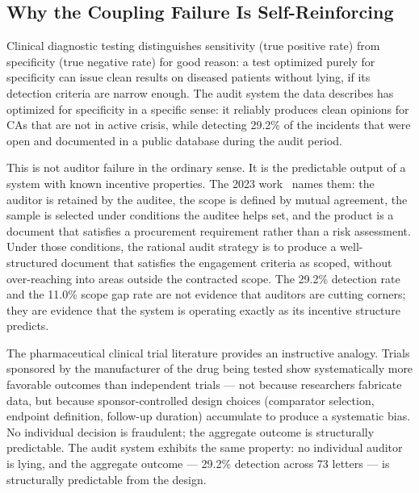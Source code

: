 \documentclass[10pt,twocolumn,letterpaper]{article}
\begin{document}
\subsection{Why the Coupling Failure Is Self-Reinforcing}

Clinical diagnostic testing distinguishes sensitivity (true positive
rate) from specificity (true negative rate) for good reason: a test
optimized purely for specificity can issue clean results on diseased
patients without lying, if its detection criteria are narrow enough.
The audit system the data describes has optimized for specificity in
a specific sense: it reliably produces clean opinions for CAs that
are not in active crisis, while detecting 29.2\% of the incidents that
were open and documented in a public database during the audit period.

This is not auditor failure in the ordinary sense. It is the predictable
output of a system with known incentive properties. The 2023
work~\cite{hurst2023} names them: the auditor is retained by the auditee,
the scope is defined by mutual agreement, the sample is selected under
conditions the auditee helps set, and the product is a document that
satisfies a procurement requirement rather than a risk assessment. Under
those conditions, the rational audit strategy is to produce a
well-structured document that satisfies the engagement criteria as
scoped, without over-reaching into areas outside the contracted scope. The 29.2\% detection rate and the 11.0\% scope gap rate are not evidence that auditors
are cutting corners; they are
evidence that the system is operating exactly as its incentive structure
predicts.

The pharmaceutical clinical trial literature provides an instructive
analogy. Trials sponsored by the manufacturer of the drug being tested
show systematically more favorable outcomes than independent trials ---
not because researchers fabricate data, but because sponsor-controlled
design choices (comparator selection, endpoint definition, follow-up
duration) accumulate to produce a systematic bias. No individual
decision is fraudulent; the aggregate outcome is structurally
predictable. The audit system exhibits the same property: no individual
auditor is lying, and the aggregate outcome --- 29.2\% detection across
73 letters --- is structurally predictable from the design.
\end{document}
